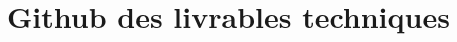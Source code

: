 \documentclass[12pt,twoside]{book}
\begin{document}


\appendix
\chapter[Github des livrables techniques]{Github des livrables techniques}


\backmatter

\glsaddall
\printnoidxglossary[type=\acronymtype,title={Liste des acronymes}]
\printnoidxglossary[title={Glossaire}]

\listoftables
\listoffigures
\tableofcontents
\end{document}
